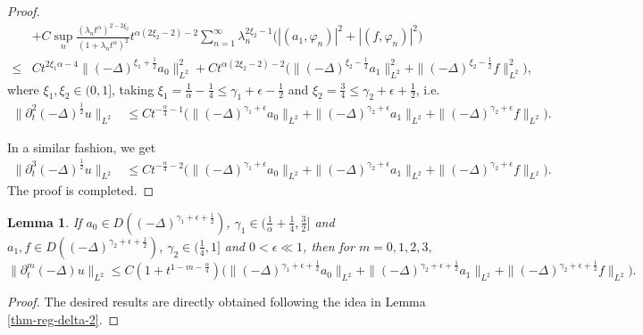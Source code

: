 \documentclass[11pt]{article}
\newtheorem{lemma}{Lemma}[section]
\numberwithin{equation}{section}
\begin{document}
\begin{proof}
\begin{align*}
&+C\sup_n\frac{(\lambda_nt^\alpha)^{2-2\xi_2}}{(1+\lambda_nt^\alpha)^2}t^{\alpha(2\xi_2-2)-2}\sum_{n=1}^\infty \lambda_n^{2\xi_2-1}\Big(|(a_1, \varphi_n)|^2+|(f, \varphi_n)|^2\Big)\\
\le& Ct^{2\xi_1\alpha-4}\|(-\Delta)^{\xi_1+\frac12}a_0\|_{L^2}^2+ Ct^{\alpha(2\xi_2-2)-2}\Big(\|(-\Delta)^{\xi_2-\frac12}a_1\|_{L^2}^2+\|(-\Delta)^{\xi_2-\frac12}f\|_{L^2}^2\Big),
\end{align*}
where $\xi_1,\xi_2\in(0,1]$, taking $\xi_1=\frac{1}{\alpha}-\frac14\le\gamma_1+\epsilon-\frac12$ and $\xi_2=\frac34\leq\gamma_2+\epsilon+\frac12$, i.e.
\begin{align*}
\|\partial_t^2(-\Delta)^{\frac12}u\|_{L^2}
&\le Ct^{-\frac{\alpha}{4}-1}\Big(\|(-\Delta)^{\gamma_1+\epsilon}a_0\|_{L^2}
+\|(-\Delta)^{\gamma_2+\epsilon}a_1\|_{L^2}+\|(-\Delta)^{\gamma_2+\epsilon}f\|_{L^2}\Big).
\end{align*}

In a similar fashion, we get
\begin{align*}
\|\partial_t^3(-\Delta)^{\frac12}u\|_{L^2}
&\le Ct^{-\frac{\alpha}{4}-2}\Big(\|(-\Delta)^{\gamma_1+\epsilon}a_0\|_{L^2}
+\|(-\Delta)^{\gamma_2+\epsilon}a_1\|_{L^2}+\|(-\Delta)^{\gamma_2+\epsilon}f\|_{L^2}\Big).
\end{align*}
The proof is completed.
\end{proof}

\begin{lemma}\label{thm-reg-delta} If $a_0\in D((-\Delta)^{\gamma_1+\epsilon+\frac12})$, $\gamma_1\in(\frac{1}{\alpha}+\frac14,\frac32]$ and $a_1,f\in D((-\Delta)^{\gamma_2+\epsilon+\frac12})$, $\gamma_2\in(\frac{1}{4},1]$ and $0<\epsilon \ll 1$, then for $m=0,1,2,3,$
\[
\|\partial_t^m(-\Delta)u\|_{L^2}\le C(1+t^{1-m-\frac{\alpha}{4}})\Big(\|(-\Delta)^{\gamma_1+\epsilon+\frac12}a_0\|_{L^2}
+\|(-\Delta)^{\gamma_2+\epsilon+\frac12}a_1\|_{L^2}+\|(-\Delta)^{\gamma_2+\epsilon+\frac12}f\|_{L^2}\Big).
\]
\end{lemma}
\begin{proof}
The desired results are directly obtained following the idea in Lemma \ref{thm-reg-delta-2}.    
\end{proof}
\end{document}
